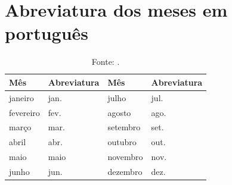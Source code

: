 \documentclass[eq,capa]{texufpel}
\begin{document}
\chapter{Abreviatura dos meses em português}
\label{anx:meses}

\begin{table}[htbp]
  \caption{Abreviatura dos meses em português}
  \centering
  \begin{tabular}{llll}
    \hline
    Mês & Abreviatura & Mês & Abreviatura \\
    \hline
    janeiro   & jan.  & julho    & jul. \\
    fevereiro & fev.  & agosto   & ago. \\
    março     & mar.  & setembro & set. \\
    abril     & abr.  & outubro  & out. \\
    maio      & maio  & novembro & nov. \\
    junho     & jun.  & dezembro & dez. \\
    \hline
  \end{tabular}
  \caption*{Fonte: \citet{ABNT:2018:NBR6023}.}
\end{table}
\end{document}
